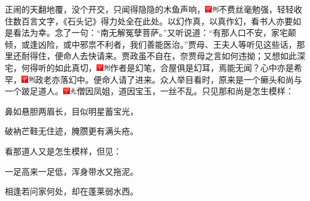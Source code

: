 正闹的天翻地覆，没个开交，只闻得隐隐的木鱼声响，{\includegraphics[width=3mm]{../Images/00002}\includegraphics[width=3mm]{../Images/00011}\footnotesize \kaishu 不费丝毫勉强，轻轻收住数百言文字，《石头记》得力处全在此处。以幻作真，以真作幻，看书人亦要如是看法为幸。}念了一句：“南无解冤孽菩萨。”又听说道：“有那人口不安，家宅颠倾，或逢凶险，或中邪祟不利者，我们善能医治。”贾母、王夫人等听见这些话，那里还耐得住，便命人去快请来。贾政虽不自在，奈贾母之言如何违拗；又想如此深宅，何得听的如此真切，{\includegraphics[width=3mm]{../Images/00002}\includegraphics[width=3mm]{../Images/00011}\footnotesize \kaishu 作者是幻笔，合屋俱是幻耳，焉能无闻？}心中亦是希罕，{\includegraphics[width=3mm]{../Images/00002}\includegraphics[width=3mm]{../Images/00011}\footnotesize \kaishu 政老亦落幻中。}便命人请了进来。众人举目看时，原来是一个癞头和尚与一个跛足道人。{\includegraphics[width=3mm]{../Images/00002}\includegraphics[width=3mm]{../Images/00012}\footnotesize \kaishu 僧因凤姐，道因宝玉，一丝不乱。}只见那和尚是怎生模样：

鼻如悬胆两眉长，目似明星蓄宝光，

破衲芒鞋无住迹，腌臜更有满头疮。

看那道人又是怎生模样，但见：

一足高来一足低，浑身带水又拖泥。

相逢若问家何处，却在蓬莱弱水西。

